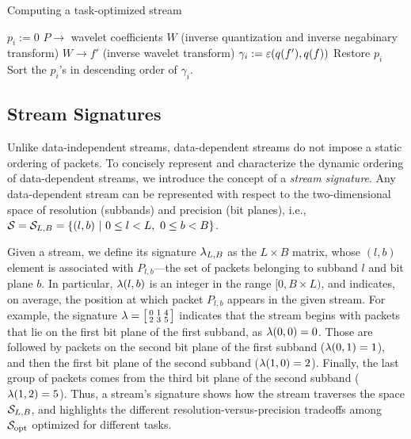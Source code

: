 \begin{algorithm}[h]
  \caption{Computing a task-optimized stream}
  \begin{algorithmic}[1]
			\State $p_i := 0$
      \State $P \rightarrow$ wavelet coefficients $W$ (inverse quantization and inverse negabinary transform)
			\State $W \rightarrow f'$ (inverse wavelet transform)
			\State $\gamma_i := \err(q(f'),q(f))$			
			\State Restore $p_i$
		\EndFor
		\State Sort the $p_i$'s in descending order of $\gamma_i$.
	\end{algorithmic}
	\label{alg:greedy}
\end{algorithm}

\subsection{Stream Signatures} \label{sec:stream-signature}

Unlike data-independent streams, data-dependent streams do not impose a static ordering of packets.
To concisely represent and characterize the dynamic ordering of data-dependent streams, we introduce
the concept of a \emph{stream signature}.  Any data-dependent stream can be represented with respect
to the two-dimensional space of resolution (subbands) and precision (bit planes), i.e., \mbox{$\strm
= \strm_{L,B}=\{(l,b)\ |\ 0\leq l < L,\ 0\leq b < B\}$.}

Given a stream, we define its signature $\sgn_{L,B}$ as the $L \times B$ matrix, whose $(l,b)$
element is associated with $P_{l,b}$---the set of packets belonging to subband $l$ and bit plane
$b$. In particular, $\sgn(l,b)$ is an integer in the range $[0, B\times L)$, and indicates, on
average, the position at which packet $P_{l,b}$ appears in the given stream. For example, the
signature $\sgn=\bigl[ \begin{smallmatrix}0 & 1 & 4\\ 2 & 3 & 5\end{smallmatrix}\bigr]$ indicates
that the stream begins with packets that lie on the first bit plane of the first subband, as
$\sgn(0,0)=0$. Those are followed by packets on the second bit plane of the first subband
($\sgn(0,1)=1$), and then the first bit plane of the second subband ($\sgn(1,0)=2$). Finally, the
last group of packets comes from the third bit plane of the second subband ($\sgn(1,2)=5$). Thus, a
stream's signature shows how the stream traverses the space $\strm_{L,B}$, and highlights the
different resolution-versus-precision tradeoffs among $\sopt$ optimized for different tasks.

